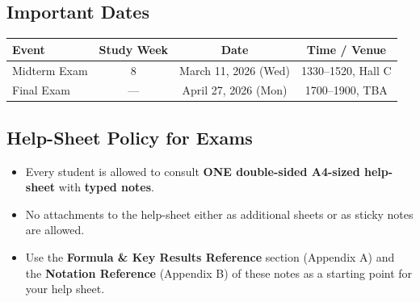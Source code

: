 
\subsection{Important Dates}


\begin{center}

\begin{tabular}{|l|c|c|c|}

\hline

\textbf{Event} & \textbf{Study Week} & \textbf{Date} & \textbf{Time / Venue} \\

\hline

Midterm Exam & 8 & March 11, 2026 (Wed) & 1330--1520, Hall C \\

\hline

Final Exam & --- & April 27, 2026 (Mon) & 1700--1900, TBA \\

\hline

\end{tabular}

\end{center}

\vspace{0.3cm}



\subsection{Help-Sheet Policy for Exams}


\begin{itemize}

\item Every student is allowed to consult \textbf{ONE double-sided A4-sized help-sheet} with \textbf{typed notes}.

\item No attachments to the help-sheet either as additional sheets or as sticky notes are allowed.

\item Use the \textbf{Formula \& Key Results Reference} section (Appendix A) and the \textbf{Notation Reference} (Appendix B) of these notes as a starting point for your help sheet.

\end{itemize}


